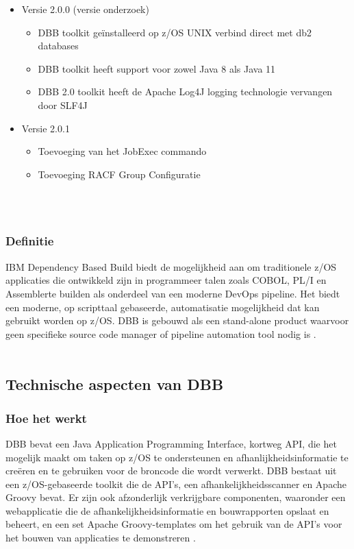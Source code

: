\begin{itemize}
    \item Versie 2.0.0 (versie onderzoek)
    \begin{itemize}
        \item DBB toolkit geïnstalleerd op z/OS UNIX verbind direct met db2 databases
        \item DBB toolkit heeft support voor zowel Java 8 als Java 11
        \item DBB 2.0 toolkit heeft de Apache Log4J logging technologie vervangen door SLF4J
    \end{itemize}
    \item Versie 2.0.1
    \begin{itemize}
        \item Toevoeging van het JobExec commando
        \item Toevoeging RACF Group Configuratie
    \end{itemize}
\end{itemize}
\autocite{IBM2023a}
\\ \\
\subsubsection{Definitie}
IBM Dependency Based Build biedt de mogelijkheid aan om traditionele z/OS applicaties die ontwikkeld zijn in programmeer talen zoals COBOL, PL/I en Assemblerte builden als onderdeel van een moderne DevOps pipeline. Het biedt een moderne, op scripttaal gebaseerde, automatisatie mogelijkheid dat kan gebruikt worden op z/OS. DBB is gebouwd als een stand-alone product waarvoor geen specifieke source code manager of pipeline automation tool nodig is \autocite{IBM2023b}.
\\ \\
\subsection{Technische aspecten van DBB}
\subsubsection{Hoe het werkt}
DBB bevat een Java Application Programming Interface, kortweg API, die het mogelijk maakt om taken op z/OS te ondersteunen en afhanlijkheidsinformatie te creëren en te gebruiken voor de broncode die wordt verwerkt. DBB bestaat uit een z/OS-gebaseerde toolkit die de API's, een afhankelijkheidsscanner en Apache Groovy bevat. Er zijn ook afzonderlijk verkrijgbare componenten, waaronder een webapplicatie die de afhankelijkheidsinformatie en bouwrapporten opslaat en beheert, en een set Apache Groovy-templates om het gebruik van de API's voor het bouwen van applicaties te demonstreren \autocite{IBM2021}.
\\ \\
